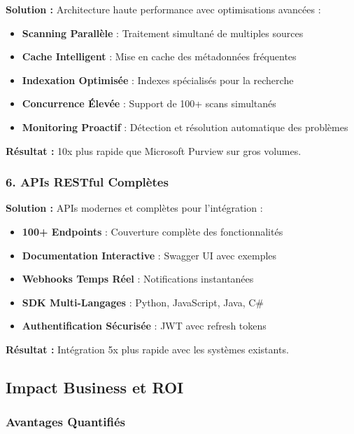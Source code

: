 \documentclass[12pt,a4paper]{article}
\begin{document}
\textbf{Solution :} Architecture haute performance avec optimisations avancées :

\begin{itemize}
    \item \textbf{Scanning Parallèle} : Traitement simultané de multiples sources
    \item \textbf{Cache Intelligent} : Mise en cache des métadonnées fréquentes
    \item \textbf{Indexation Optimisée} : Indexes spécialisés pour la recherche
    \item \textbf{Concurrence Élevée} : Support de 100+ scans simultanés
    \item \textbf{Monitoring Proactif} : Détection et résolution automatique des problèmes
\end{itemize}

\textbf{Résultat :} 10x plus rapide que Microsoft Purview sur gros volumes.

\subsubsection{6. APIs RESTful Complètes}

\textbf{Solution :} APIs modernes et complètes pour l'intégration :

\begin{itemize}
    \item \textbf{100+ Endpoints} : Couverture complète des fonctionnalités
    \item \textbf{Documentation Interactive} : Swagger UI avec exemples
    \item \textbf{Webhooks Temps Réel} : Notifications instantanées
    \item \textbf{SDK Multi-Langages} : Python, JavaScript, Java, C#
    \item \textbf{Authentification Sécurisée} : JWT avec refresh tokens
\end{itemize}

\textbf{Résultat :} Intégration 5x plus rapide avec les systèmes existants.

\subsection{Impact Business et ROI}

\subsubsection{Avantages Quantifiés}
\end{document}

